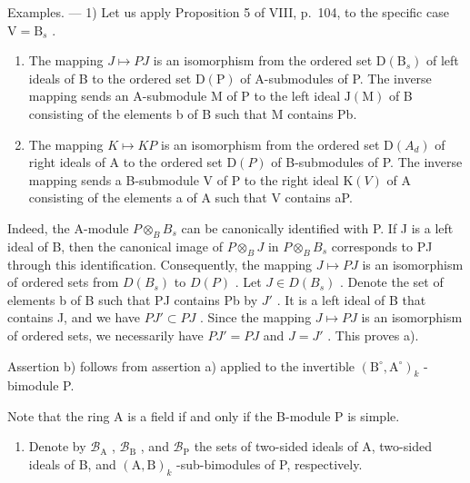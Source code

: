 Examples. --- 1) Let us apply Proposition 5 of VIII, p.~104, to the specific case \(\mathrm{V} = \mathrm{B}_s\) .

\begin{enumerate}
\def\labelenumi{\alph{enumi})}
\item
  The mapping \(J \mapsto PJ\) is an isomorphism from the ordered set \(\mathrm{D}(\mathrm{B}_{s})\) of left ideals of B to the ordered set \(\mathrm{D}(\mathrm{P})\) of A-submodules of P. The inverse mapping sends an A-submodule M of P to the left ideal \(\mathrm{J}(\mathrm{M})\) of B consisting of the elements b of B such that M contains Pb.
\item
  The mapping \(K \mapsto KP\) is an isomorphism from the ordered set \(\mathrm{D}(A_{d})\) of right ideals of A to the ordered set \(\mathrm{D}(P)\) of B-submodules of P. The inverse mapping sends a B-submodule V of P to the right ideal \(\mathrm{K}(V)\) of A consisting of the elements a of A such that V contains aP.
\end{enumerate}

Indeed, the A-module \(P \otimes_{B} B_{s}\) can be canonically identified with P. If J is a left ideal of B, then the canonical image of \(P \otimes_{B} J\) in \(P \otimes_{B} B_{s}\) corresponds to PJ through this identification. Consequently, the mapping \(J \mapsto PJ\) is an isomorphism of ordered sets from \(D(B_{s})\) to \(D(P)\) . Let \(J \in D(B_{s})\) . Denote the set of elements b of B such that PJ contains Pb by \(J'\) . It is a left ideal of B that contains J, and we have \(PJ' \subset PJ\) . Since the mapping \(J \mapsto PJ\) is an isomorphism of ordered sets, we necessarily have \(PJ' = PJ\) and \(J = J'\) . This proves a).

Assertion b) follows from assertion a) applied to the invertible \((\mathrm{B}^{\circ},\mathrm{A}^{\circ})_{k}\) -bimodule P.

Note that the ring A is a field if and only if the B-module P is simple.

\begin{enumerate}
\def\labelenumi{\arabic{enumi})}
\setcounter{enumi}{1}
\tightlist
\item
  Denote by \(\mathcal{B}_{\mathrm{A}}\) , \(\mathcal{B}_{\mathrm{B}}\) , and \(\mathcal{B}_{\mathrm{P}}\) the sets of two-sided ideals of A, two-sided ideals of B, and \((\mathrm{A},\mathrm{B})_k\) -sub-bimodules of P, respectively.
\end{enumerate}

